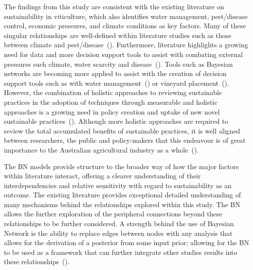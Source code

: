 \documentclass[10pt,letterpaper]{article}
\begin{document}
The findings from this study are consistent with the existing literature on sustainability in viticulture, which also identifies water management, pest/disease control, economic pressures, and climate conditions as key factors. Many of these singular relationships are well-defined within literature studies such as those between climate and pest/disease~(\cite{olatinwoChapterWeatherbasedPest2014}). Furthermore, literature  highlights a growing need for data and more decision support tools to assist with combating external pressures such climate, water scarcity and disease~(\cite{naigeonDATADecisionmakingViticulture2023,stefaniniBayesianCausalModel2022,fincoCombiningPrecisionViticulture2022a,laurentLocalInfluenceClimate2022}). Tools such as Bayesian networks are becoming more applied to assist with the creation of decision support tools such as with water management~(\cite{carmonaUseParticipatoryObjectOriented2011}) or vineyard placement~(\cite{abbalDecisionSupportSystem2016}). However, the combination of holistic approaches to reviewing sustainable practices in the adoption of techniques through measurable and holistic approaches is a growing need in policy creation and uptake of new novel sustainable practices~(\cite{mayfieldDesigningExpertledBayesian2023,baianoOverviewSustainabilityWine2021,dichiaraCollaborativeApproachAchieving2024}). Although more holistic approaches are required to review the total accumulated benefits of sustainable practices, it is well aligned between researchers, the public and policy-makers that this endeavour is of great importance to the Australian agricultural industry as a whole~(\cite{dumbrellComparingAustralianPublic2024}).

The BN models provide structure to the broader way of how the major factors within literature interact, offering a clearer understanding of their interdependencies and relative sensitivity with regard to sustainability as an outcome. The existing literature provides exceptional detailed understanding of many mechanisms behind the relationships explored within this study. The BN allows the further exploration of the peripheral connections beyond these relationships to be further considered. A strength behind the use of Bayesian Network is the ability to replace edges between nodes with any analysis that allows for the derivation of a posterior from some input prior; allowing for the BN to be used as a framework that can further integrate other studies results into these relationships~(\cite{kimphuctranMachineLearningProbabilistic2022,kollerObjectOrientedBayesianNetworks1997,korbBayesianArtificialIntelligence2011}).
\end{document}
